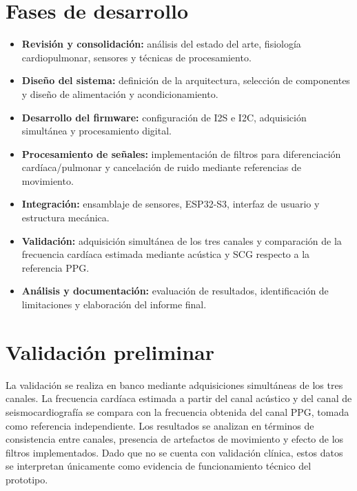\section{Fases de desarrollo}\label{objetivo2}

\begin{itemize}
    \item \textbf{Revisión y consolidación:} análisis del estado del arte, fisiología cardiopulmonar, sensores y técnicas de procesamiento.
    \item \textbf{Diseño del sistema:} definición de la arquitectura, selección de componentes y diseño de alimentación y acondicionamiento.
    \item \textbf{Desarrollo del firmware:} configuración de I2S e I2C, adquisición simultánea y procesamiento digital.
    \item \textbf{Procesamiento de señales:} implementación de filtros para diferenciación cardíaca/pulmonar y cancelación de ruido mediante referencias de movimiento.
    \item \textbf{Integración:} ensamblaje de sensores, ESP32-S3, interfaz de usuario y estructura mecánica.
    \item \textbf{Validación:} adquisición simultánea de los tres canales y comparación de la frecuencia cardíaca estimada mediante acústica y SCG respecto a la referencia PPG.
    \item \textbf{Análisis y documentación:} evaluación de resultados, identificación de limitaciones y elaboración del informe final.
\end{itemize}

\section{Validación preliminar}\label{objetivo3}

La validación se realiza en banco mediante adquisiciones simultáneas de los tres canales. La frecuencia cardíaca estimada a partir del canal acústico y del canal de seismocardiografía se compara con la frecuencia obtenida del canal PPG, tomada como referencia independiente. Los resultados se analizan en términos de consistencia entre canales, presencia de artefactos de movimiento y efecto de los filtros implementados. Dado que no se cuenta con validación clínica, estos datos se interpretan únicamente como evidencia de funcionamiento técnico del prototipo.

